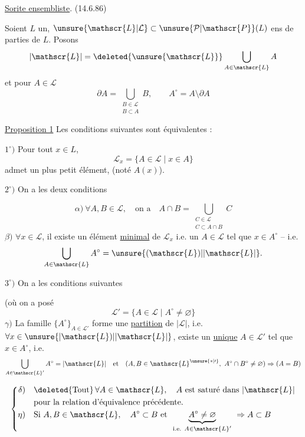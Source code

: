 \uline{Sorite ensembliste}. \quad (14.6.86)

Soient $L$ un, $\unsure{\mathscr{L}|\mathcal{L}}\subset\unsure{\mathcal{P}|\mathscr{P}}(L)$ ens de parties de $L$. Posons
\[
|\mathscr{L}|=\deleted{\unsure{\mathscr{L}}}\bigcup_{A\in\mathscr{L}}A
\]
et pour $A\in\mathscr{L}$
\[
\partial A=\bigcup_{\substack{B\in\mathscr{L}\\B\subset A}}B,\qquad A^\circ=A\setminus\partial A
\]

\uline{Proposition 1} Les conditions suivantes sont équivalentes :

$1^\circ)$ Pour tout $x\in L$,  
\[
\mathscr{L}_x=\{A\in\mathscr{L}\mid x\in A\}
\]
admet un plus petit élément, (noté $A(x)$).

$2^\circ)$ On a les deux conditions

\[
\alpha)\ \forall A,B\in\mathscr{L},\quad\text{on a}\quad
 A\cap B=\bigcup_{\substack{C\in\mathscr{L}\\C\subset A\cap B}}C
\]
$\beta)$ $\forall x\in\mathscr{L}$, il existe un élément \uline{minimal} de $\mathscr{L}_x$ i.e. un $A\in\mathscr{L}$ tel que $x\in A^\circ$ -- i.e.
\[
\bigcup_{A\in\mathscr{L}}A^\circ=\unsure{(\mathscr{L})|\lvert\mathscr{L}\rvert}.
\]

$3^\circ)$ On a les  conditions suivantes

(où  on a posé
\[
\mathscr{L}'=\{A\in\mathscr{L}\mid A^\circ\ne\varnothing\}
\]
$\gamma)$ La famille $\{A^\circ\}_{A\in\mathscr{L}'}$ forme une \uline{partition} de $|\mathscr{L}|$, i.e. $\forall x\in\unsure{\lvert\mathscr{L})|\lvert\mathscr{L}\rvert}$, \deleted{\unsure{\ensuremath{\exists!}}} existe un \uline{unique} $A\in\mathscr{L}'$ tel que $x\in A^\circ$, i.e.
\[
\bigcup_{A\in\mathscr{L}'} A^\circ=|\mathscr{L}|\quad\text{et}\quad
(A,B\in\mathscr{L}^{\unsure{*|\prime}},\ A^\circ\cap B^\circ\ne\varnothing)\Rightarrow(A=B)
\]

\[
\left\{\begin{aligned}
\delta)&\quad \deleted{\text{Tout}}\,\forall A\in\mathscr{L},\quad A\ \text{est saturé dans }|\mathscr{L}|\\
 &\quad\text{pour la relation d'équivalence précédente.}\\
\eta)&\quad\text{Si } A,B\in\mathscr{L},\quad A^\circ\subset B\ \text{et }\
 \underset{\text{i.e. } A\in\mathscr{L}'}{\underbrace{A^\circ\ne\varnothing}}\ \Rightarrow A\subset B
\end{aligned}\right.
\]
